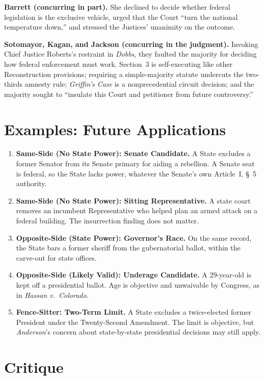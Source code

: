 \documentclass[12pt]{article}
\begin{document}
\textbf{Barrett (concurring in part).} She declined to decide whether federal legislation is the exclusive vehicle, urged that the Court ``turn the national temperature down,'' and stressed the Justices' unanimity on the outcome.

\textbf{Sotomayor, Kagan, and Jackson (concurring in the judgment).} Invoking Chief Justice Roberts's restraint in \textit{Dobbs}, they faulted the majority for deciding how federal enforcement must work. Section~3 is self-executing like other Reconstruction provisions; requiring a simple-majority statute undercuts the two-thirds amnesty rule; \textit{Griffin's Case} is a nonprecedential circuit decision; and the majority sought to ``insulate this Court and petitioner from future controversy.''

\section{Examples: Future Applications}

\begin{enumerate}
\item \textbf{Same-Side (No State Power): Senate Candidate.} A State excludes a former Senator from its Senate primary for aiding a rebellion. A Senate seat is federal, so the State lacks power, whatever the Senate's own Article~I, \S~5 authority.
\item \textbf{Same-Side (No State Power): Sitting Representative.} A state court removes an incumbent Representative who helped plan an armed attack on a federal building. The insurrection finding does not matter.
\item \textbf{Opposite-Side (State Power): Governor's Race.} On the same record, the State bars a former sheriff from the gubernatorial ballot, within the carve-out for state offices.
\item \textbf{Opposite-Side (Likely Valid): Underage Candidate.} A 29-year-old is kept off a presidential ballot. Age is objective and unwaivable by Congress, as in \textit{Hassan v.\ Colorado}.
\item \textbf{Fence-Sitter: Two-Term Limit.} A State excludes a twice-elected former President under the Twenty-Second Amendment. The limit is objective, but \textit{Anderson}'s concern about state-by-state presidential decisions may still apply.
\end{enumerate}

\section{Critique}
\end{document}
